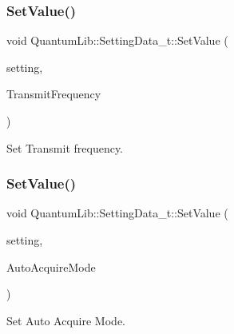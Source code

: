 \subsubsection{\texorpdfstring{Set\+Value()}{SetValue()}\hspace{0.1cm}{\footnotesize\ttfamily [9/26]}}
{\footnotesize\ttfamily void Quantum\+Lib\+::\+Setting\+Data\+\_\+t\+::\+Set\+Value (\begin{DoxyParamCaption}\item[{\mbox{\hyperlink{namespace_quantum_lib_acc8124e3e65bca4aa798d03a55e3d54c}{e\+Settings\+\_\+t}}}]{setting,  }\item[{\mbox{\hyperlink{namespace_quantum_lib_af636ea7f14f5a62bfcfc1132c9c78019}{e\+Transmit\+Frequency\+\_\+t}}}]{Transmit\+Frequency }\end{DoxyParamCaption})\hspace{0.3cm}{\ttfamily [inline]}}



Set Transmit frequency. 

\mbox{\label{struct_quantum_lib_1_1_setting_data__t_aca6ac94b7516de5b57f37fe8d8e8190d}} 
\subsubsection{\texorpdfstring{Set\+Value()}{SetValue()}\hspace{0.1cm}{\footnotesize\ttfamily [10/26]}}
{\footnotesize\ttfamily void Quantum\+Lib\+::\+Setting\+Data\+\_\+t\+::\+Set\+Value (\begin{DoxyParamCaption}\item[{\mbox{\hyperlink{namespace_quantum_lib_acc8124e3e65bca4aa798d03a55e3d54c}{e\+Settings\+\_\+t}}}]{setting,  }\item[{\mbox{\hyperlink{namespace_quantum_lib_ad91dac4bf2ef5d3615cb423383b961d8}{e\+Auto\+Acquire\+Mode\+\_\+t}}}]{Auto\+Acquire\+Mode }\end{DoxyParamCaption})\hspace{0.3cm}{\ttfamily [inline]}}



Set Auto Acquire Mode. 

\mbox{\label{struct_quantum_lib_1_1_setting_data__t_a840c5c09718c7ec1f8e6b8e714558e50}} 
